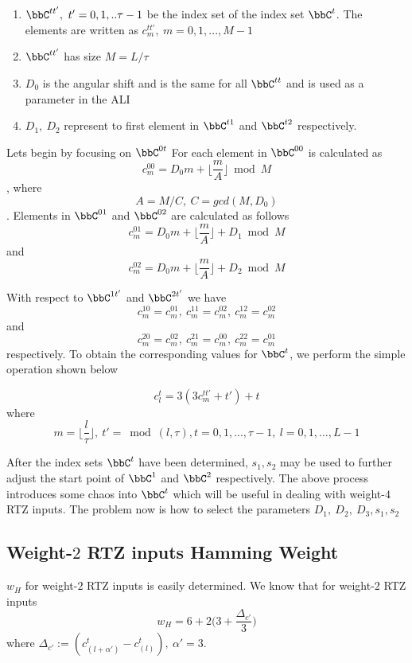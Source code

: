 \documentclass[11pt, oneside, dvipdfmx]{book}
\begin{document}
\begin{enumerate}
\item $\bbC^{tt'},~t'=0,1,..\tau-1$ be the index set of the index set $\bbC^t$. The
 elements are written as $c^{tt'}_m,~m=0,1,...,M-1$

\item $\bbC^{tt'}$ has size $M=L/\tau$

\item $D_0$ is the angular shift and is the same for all $\bbC^{tt}$ and is used as a parameter in the ALI

\item $D_1,~D_2$ represent to first element in $\bbC^{t1}$ and $\bbC^{t2}$ respectively.

\end{enumerate}
Lets begin by focusing on $\bbC^{0t}$
 For each element in $\bbC^{00}$ is calculated as $$c_m^{00}=D_0m+\lfloor \frac{m}{A} \rfloor \bmod M $$, where $$A=M/C,~C=gcd(M,D_0)$$.
 Elements in  $\bbC^{01}$ and $\bbC^{02}$ are calculated as follows
 $$c_m^{01}=D_0m+\lfloor \frac{m}{A} \rfloor+D_1 \bmod M $$
 and
 $$c_m^{02}=D_0m+\lfloor \frac{m}{A} \rfloor +D_2\bmod M $$
 
 With respect to $\bbC^{1t'}$ and $\bbC^{2t'}$ we have 
$$ c_m^{10}=c_m^{01},~c_m^{11}=c_m^{02},~c_m^{12}=c_m^{02}$$ and
$$ c_m^{20}=c_m^{02},~c_m^{21}=c_m^{00},~c_m^{22}=c_m^{01}$$
respectively.
To obtain the corresponding values for $\bbC^t$, we perform the simple operation shown below
 
 \begin{equation} 
 c^{t}_l=3(3c^{tt'}_{m}+t')+t
 \label{eq12}
 \end{equation} 
 where $$ m=\Big \lfloor \frac{l}{\tau} \Big \rfloor, ~t'=\bmod(l,\tau),t=0,1,...,\tau-1,~l=0,1,...,L-1$$
 
 After the index sets $\bbC^t$ have been determined, $s_1,s_2$ may be used to further adjust the start point of $\bbC^1$ and $\bbC^2$ respectively.
 The above process introduces some chaos into $\bbC^t$ which will be useful in dealing with weight-$4$ RTZ inputs. The problem now is how to select the parameters $D_1,~D_2,~D_3,s_1,s_2$
 
 \subsection{Weight-$2$ RTZ inputs Hamming Weight}
 $w_H$ for weight-$2$ RTZ inputs is easily determined. 
 We know that for weight-$2$ RTZ inputs $$
w_H=6+2\Big(3+\frac{\Delta_{c'}}{3}\Big)
$$
where
$\Delta_{c'}:=(c_{(l+\alpha')}^{t}-c_{(l)}^{t}),~\alpha' =3$. 
\end{document}
